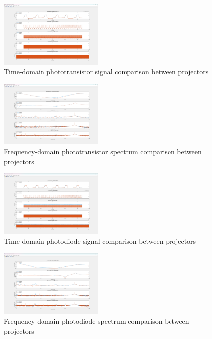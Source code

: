 \documentclass[conference]{IEEEtran}
\begin{document}
\begin{figure}[H]
	\centerline{\includegraphics[width=0.45\textwidth]{projector-phototransistor-time.png}}
	\caption{Time-domain phototransistor signal comparison between projectors}
	\label{fig:projector-phototransistor-time}
\end{figure}
\begin{figure}[H]
	\centerline{\includegraphics[width=0.45\textwidth]{projector-phototransistor-frequency.png}}
	\caption{Frequency-domain phototransistor spectrum comparison between projectors}
	\label{fig:projector-phototransistor-frequency}
\end{figure}
\begin{figure}[H]
	\centerline{\includegraphics[width=0.45\textwidth]{projector-photodiode-time.png}}
	\caption{Time-domain photodiode signal comparison between projectors}
	\label{fig:projector-photodiode-time}
\end{figure}
\begin{figure}[H]
	\centerline{\includegraphics[width=0.45\textwidth]{projector-photodiode-frequency.png}}
	\caption{Frequency-domain photodiode spectrum comparison between projectors}
	\label{fig:projector-photodiode-frequency}
\end{figure}
\end{document}
